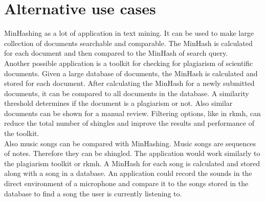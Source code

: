 \section{Alternative use cases}

MinHashing as a lot of application in text mining. It can be used to make large collection of documents searchable and comparable. The MinHash is calculated for each document and then compared to the MinHash of search query.\\

Another possible application is a toolkit for checking for plagiarism of scientific documents. Given a large database of documents, the MinHash is calculated and stored for each document. After calculating the MinHash for a newly submitted documents, it can be compared to all documents in the database. A similarity threshold determines if the document is a plagiarism or not. Also similar documents can be shown for a manual review. Filtering options, like in rkmh, can reduce the total number of shingles and improve the results and performance of the toolkit.\\

Also music songs can be compared with MinHashing. Music songs are sequences of notes. Therefore they can be shingled. The application would work similarly to the plagiarism toolkit or rkmh. A MinHash for each song is calculated and stored along with a song in a database. An application could record the sounds in the direct environment of a microphone and compare it to the songs stored in the database to find a song the user is currently listening to.\\